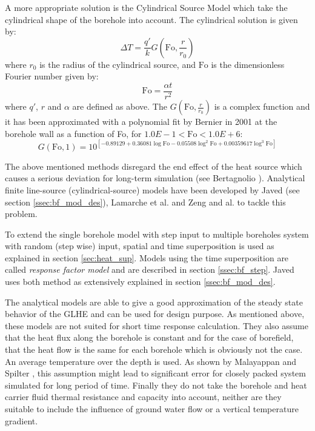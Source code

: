 \documentclass[a4paper,oneside,11pt]{report}
\begin{document}
A more appropriate solution is the Cylindrical Source Model which take the cylindrical shape of the borehole into account. The cylindrical solution is given by:
\begin{equation} \label{eq:bf_cylSouSol}
	\Delta T = \frac{q'}{k} G\left( \mathrm{Fo}, \frac{r}{r_0} \right)
\end{equation}
where $r_0$ is the radius of the cylindrical source, and $\mathrm{Fo}$ is the dimensionless Fourier number given by:
\begin{equation} \label{eq:bf_fouNb}
	\mathrm{Fo} = \frac{\alpha t}{r^2}
\end{equation}
where $q'$, $r$ and $\alpha$ are defined as above. The $G(\mathrm{Fo},\frac{r}{r_0})$ is a complex function and it has been approximated with a polynomial fit by Bernier in 2001 \cite{chi07} at the borehole wall as a function of Fo, for $1.0E-1<\mathrm{Fo}<1.0E+6$:
\begin{equation} \label{eq:bf_GApp}
	G(\mathrm{Fo},1) = 10^{\left[ -0.89129+0.36081 \log \mathrm{Fo} - 0.05508 \log^2 \mathrm{Fo} + 0.00359617 \log^3 \mathrm{Fo} \right]}
\end{equation}

The above mentioned methods disregard the end effect of the heat source which causes a serious deviation for long-term simulation (see Bertagnolio \cite{bert12}). Analytical finite line-source (cylindrical-source) models have been developed by Javed \cite{jav12} (see section \ref{ssec:bf_mod_des}), Lamarche et al. \cite{lam07a, lam07b} and Zeng and al. \cite{zen02} to tackle this problem. 

To extend the single borehole model with step input to multiple boreholes system with random (step wise) input, spatial and time superposition is used as explained in section \ref{sec:heat_sup}. Models using the time superposition are called \textit{response factor model} and are described in section \ref{ssec:bf_step}. Javed \cite{jav12} uses both method as extensively explained in section \ref{ssec:bf_mod_des}.

The analytical models are able to give a good approximation of the steady state behavior of the GLHE and can be used for design purpose. As mentioned above, these models are not suited for short time response calculation. They also assume that the heat flux along the borehole is constant and for the case of borefield, that the heat flow is the same for each borehole which is obviously not the case. An average temperature over the depth is used. As shown by Malayappan and Spilter \cite{mal12}, this assumption might lead to significant error for closely packed system simulated for long period of time. Finally they do not take the borehole and heat carrier fluid thermal resistance and capacity into account, neither are they suitable to include the influence of ground water flow or a vertical temperature gradient.
\end{document}
